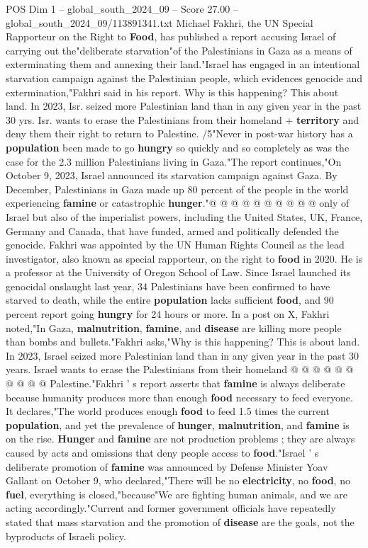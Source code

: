 \begin{textsample}{POS Dim 1 – global\_south\_2024\_09 – Score 27.00 – global\_south\_2024\_09/113891341.txt}  \label{ex:f1_pos_209}
Michael Fakhri, the UN Special Rapporteur on the Right to \textbf{Food}, has published a report accusing Israel of carrying out the"deliberate starvation"of the Palestinians in Gaza as a means of exterminating them and annexing their land."Israel has engaged in an intentional starvation campaign against the Palestinian people, which evidences genocide and extermination,"Fakhri said in his report.
Why is this happening?
This about land.
In 2023, Isr. seized more Palestinian land than in any given year in the past 30 yrs.
Isr. wants to erase the Palestinians from their homeland + \textbf{territory} and deny them their right to return to Palestine. /5"Never in post-war history has a \textbf{population} been made to go \textbf{hungry} so quickly and so completely as was the case for the 2.3 million Palestinians living in Gaza."The report continues,"On October 9, 2023, Israel announced its starvation campaign against Gaza.
By December, Palestinians in Gaza made up 80 percent of the people in the world experiencing \textbf{famine} or catastrophic \textbf{hunger}."@ @ @ @ @ @ @ @ @ @ only of Israel but also of the imperialist powers, including the United States, UK, France, Germany and Canada, that have funded, armed and politically defended the genocide.
Fakhri was appointed by the UN Human Rights Council as the lead investigator, also known as special rapporteur, on the right to \textbf{food} in 2020.
He is a professor at the University of Oregon School of Law.
Since Israel launched its genocidal onslaught last year, 34 Palestinians have been confirmed to have starved to death, while the entire \textbf{population} lacks sufficient \textbf{food}, and 90 percent report going \textbf{hungry} for 24 hours or more.
In a post on X, Fakhri noted,"In Gaza, \textbf{malnutrition}, \textbf{famine}, and \textbf{disease} are killing more people than bombs and bullets."Fakhri asks,"Why is this happening?
This is about land.
In 2023, Israel seized more Palestinian land than in any given year in the past 30 years.
Israel wants to erase the Palestinians from their homeland @ @ @ @ @ @ @ @ @ @ Palestine."Fakhri ' s report asserts that \textbf{famine} is always deliberate because humanity produces more than enough \textbf{food} necessary to feed everyone.
It declares,"The world produces enough \textbf{food} to feed 1.5 times the current \textbf{population}, and yet the prevalence of \textbf{hunger}, \textbf{malnutrition}, and \textbf{famine} is on the rise. \textbf{Hunger} and \textbf{famine} are not production problems ; they are always caused by acts and omissions that deny people access to \textbf{food}."Israel ' s deliberate promotion of \textbf{famine} was announced by Defense Minister Yoav Gallant on October 9, who declared,"There will be no \textbf{electricity}, no \textbf{food}, no \textbf{fuel}, everything is closed,"because"We are fighting human animals, and we are acting accordingly."Current and former government officials have repeatedly stated that mass starvation and the promotion of \textbf{disease} are the goals, not the byproducts of Israeli policy.

\end{textsample}
